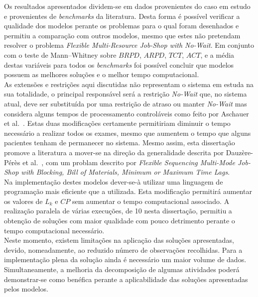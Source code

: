 Os resultados apresentados dividem-se em dados provenientes do caso em estudo e provenientes de \textit{benchmarks} da literatura. Desta forma é possível verificar a qualidade dos modelos perante os problemas para o qual foram desenhados e permitiu a comparação com outros modelos, mesmo que estes não pretendam resolver o problema \textit{Flexible Multi-Resource Job-Shop with No-Wait}. Em conjunto com o teste de Mann–Whitney sobre $BRPD$, $ARPD$, $TCT$, $ACT$, e a média destas variáveis para todos os \textit{benchmarks} foi possível concluir que modelos possuem as melhores soluções e o melhor tempo computacional.\\

As extensões e restrições aqui discutidas não representam o sistema em estuda na sua totalidade, o principal responsável será a restrição \textit{No-Wait} que, no sistema atual, deve ser substituída por uma restrição de atraso ou manter \textit{No-Wait} mas considera alguns tempos de processamento controláveis como feito por Aschauer et al.~\cite{aschauerEfficientSchedulingStochastic2020}. Estas duas modificações certamente permitiriam diminuir o tempo necessário a realizar todos os exames, mesmo que aumentem o tempo que alguns pacientes tenham de permanecer no sistema. Mesmo assim, esta dissertação promove a literatura a mover-se na direção da generalidade descrita por Dauzère-Pérès et al.~\cite{dauzere-peresFlexibleJobShop2024}, com um problam descrito por \textit{Flexible Sequencing Multi-Mode Job-Shop with Blocking, Bill of Materials, Minimum or Maximum Time Lags}.\\

Na implementação destes modelos dever-se-à utilizar uma linguagem de programação mais eficiente que a utilizada. Esta modificação permitirá aumentar os valores de $L_{k}$ e $CP$ sem aumentar o tempo computacional associado. A realização paralela de várias execuções, de 10 nesta dissertação, permitiu a obtenção de soluções com maior qualidade com pouco detrimento perante o tempo computacional necessário.\\

Neste momento, existem limitações na aplicação das soluções apresentadas, devido, nomeadamente, ao reduzido número de observações recolhidas. Para a implementação plena da solução ainda é necessário um maior volume de dados. Simultaneamente, a melhoria da decomposição de algumas atividades poderá demonstrar-se como benéfica perante a aplicabilidade das soluções apresentadas pelos modelos.\\